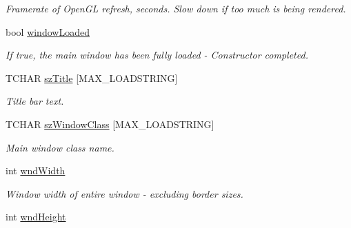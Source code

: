 \begin{DoxyCompactItemize}
\begin{DoxyCompactList}\small\item\em Framerate of OpenGL refresh, seconds. Slow down if too much is being rendered. \end{DoxyCompactList}\item 
\hypertarget{class_three_d_viewer_a17da7bcd5e186a32764de710773f242a}{
bool \hyperlink{class_three_d_viewer_a17da7bcd5e186a32764de710773f242a}{windowLoaded}}
\label{class_three_d_viewer_a17da7bcd5e186a32764de710773f242a}

\begin{DoxyCompactList}\small\item\em If true, the main window has been fully loaded -\/ Constructor completed. \end{DoxyCompactList}\item 
\hypertarget{class_three_d_viewer_a92fd4fc91498ce59cdb907f2d6d3fe69}{
TCHAR \hyperlink{class_three_d_viewer_a92fd4fc91498ce59cdb907f2d6d3fe69}{szTitle} \mbox{[}MAX\_\-LOADSTRING\mbox{]}}
\label{class_three_d_viewer_a92fd4fc91498ce59cdb907f2d6d3fe69}

\begin{DoxyCompactList}\small\item\em Title bar text. \end{DoxyCompactList}\item 
\hypertarget{class_three_d_viewer_a35039eb5b10ab86181bac96dbe8ff8b6}{
TCHAR \hyperlink{class_three_d_viewer_a35039eb5b10ab86181bac96dbe8ff8b6}{szWindowClass} \mbox{[}MAX\_\-LOADSTRING\mbox{]}}
\label{class_three_d_viewer_a35039eb5b10ab86181bac96dbe8ff8b6}

\begin{DoxyCompactList}\small\item\em Main window class name. \end{DoxyCompactList}\item 
\hypertarget{class_three_d_viewer_af4096221fa3e7e92f59d6d6ba4aa8bc4}{
int \hyperlink{class_three_d_viewer_af4096221fa3e7e92f59d6d6ba4aa8bc4}{wndWidth}}
\label{class_three_d_viewer_af4096221fa3e7e92f59d6d6ba4aa8bc4}

\begin{DoxyCompactList}\small\item\em Window width of entire window -\/ excluding border sizes. \end{DoxyCompactList}\item 
\hypertarget{class_three_d_viewer_a969c0fb64967c520cea251e3855a3064}{
int \hyperlink{class_three_d_viewer_a969c0fb64967c520cea251e3855a3064}{wndHeight}}
\label{class_three_d_viewer_a969c0fb64967c520cea251e3855a3064}


\end{DoxyCompactItemize}
